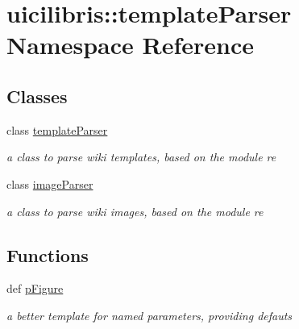 \hypertarget{namespaceuicilibris_1_1templateParser}{\section{uicilibris\-:\-:template\-Parser \-Namespace \-Reference}
\label{namespaceuicilibris_1_1templateParser}
}
\subsection*{\-Classes}
\begin{DoxyCompactItemize}
\item 
class \hyperlink{classuicilibris_1_1templateParser_1_1templateParser}{template\-Parser}
\begin{DoxyCompactList}\small\item\em a class to parse wiki templates, based on the module re \end{DoxyCompactList}\item 
class \hyperlink{classuicilibris_1_1templateParser_1_1imageParser}{image\-Parser}
\begin{DoxyCompactList}\small\item\em a class to parse wiki images, based on the module re \end{DoxyCompactList}\end{DoxyCompactItemize}
\subsection*{\-Functions}
\begin{DoxyCompactItemize}
\item 
def \hyperlink{namespaceuicilibris_1_1templateParser_ae11aa57da9437f9da25eca50de12d84f}{p\-Figure}
\begin{DoxyCompactList}\small\item\em a better template for named parameters, providing defauts \end{DoxyCompactList}\end{DoxyCompactItemize}
